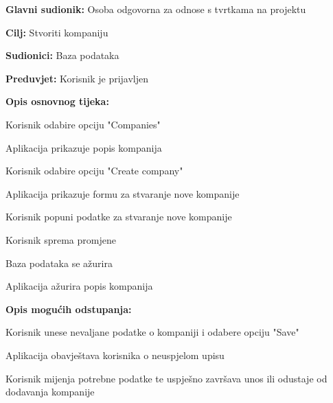 					\noindent {}
					\begin{packed_item}

						\item \textbf{Glavni sudionik:} Osoba odgovorna za odnose s tvrtkama na projektu
						\item \textbf{Cilj:} Stvoriti kompaniju
						\item \textbf{Sudionici:} Baza podataka
						\item \textbf{Preduvjet:} Korisnik je prijavljen
						\item \textbf{Opis osnovnog tijeka:}

						\item[] \begin{packed_enum}

							\item Korisnik odabire opciju "Companies"
							\item Aplikacija prikazuje popis kompanija
							\item Korisnik odabire opciju "Create company"
							\item Aplikacija prikazuje formu za stvaranje nove kompanije
							\item Korisnik popuni podatke za stvaranje nove kompanije
							\item Korisnik sprema promjene
							\item Baza podataka se ažurira
							\item Aplikacija ažurira popis kompanija

						\end{packed_enum}

						\item \textbf{Opis mogućih odstupanja:}

						\item[] \begin{packed_item}

							\item[7.b] Korisnik unese nevaljane podatke o kompaniji i odabere opciju "Save"
							\item[] \begin{packed_enum}

								\item Aplikacija obavještava korisnika o neuspjelom upisu
								\item Korisnik mijenja potrebne podatke te uspješno završava unos ili
								odustaje od dodavanja kompanije

							\end{packed_enum}

						\end{packed_item}
					\end{packed_item}


